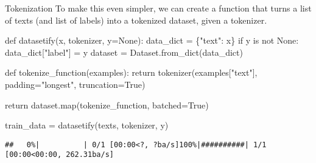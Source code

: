 \documentclass[
  10pt,
  ignorenonframetext,
  aspectratio=169]{beamer}
\newenvironment{Shaded}{\begin{snugshade}}{\end{snugshade}}
\newcommand{\BuiltInTok}[1]{\textcolor[rgb]{0.80,0.80,0.80}{#1}}
\newcommand{\ControlFlowTok}[1]{\textcolor[rgb]{0.94,0.87,0.69}{#1}}
\newcommand{\KeywordTok}[1]{\textcolor[rgb]{0.94,0.87,0.69}{#1}}
\newcommand{\NormalTok}[1]{\textcolor[rgb]{0.80,0.80,0.80}{#1}}
\newcommand{\OperatorTok}[1]{\textcolor[rgb]{0.94,0.94,0.82}{#1}}
\newcommand{\StringTok}[1]{\textcolor[rgb]{0.80,0.58,0.58}{#1}}
\newcommand{\VariableTok}[1]{\textcolor[rgb]{0.80,0.80,0.80}{#1}}
\begin{document}
\begin{frame}[fragile]{Tokenization}
\protect\hypertarget{tokenization-1}{}
To make this even simpler, we can create a function that turns a list of
texts (and list of labels) into a tokenized dataset, given a tokenizer.

\medskip
\scriptsize

\begin{Shaded}
\begin{Highlighting}[]
\KeywordTok{def}\NormalTok{ datasetify(x, tokenizer, y}\OperatorTok{=}\VariableTok{None}\NormalTok{):}
\NormalTok{    data\_dict }\OperatorTok{=}\NormalTok{ \{}\StringTok{"text"}\NormalTok{: x\}}
    \ControlFlowTok{if}\NormalTok{ y }\KeywordTok{is} \KeywordTok{not} \VariableTok{None}\NormalTok{:}
\NormalTok{        data\_dict[}\StringTok{"label"}\NormalTok{] }\OperatorTok{=}\NormalTok{ y}
\NormalTok{    dataset }\OperatorTok{=}\NormalTok{ Dataset.from\_dict(data\_dict)}

    \KeywordTok{def}\NormalTok{ tokenize\_function(examples):}
        \ControlFlowTok{return}\NormalTok{ tokenizer(examples[}\StringTok{"text"}\NormalTok{], padding}\OperatorTok{=}\StringTok{"longest"}\NormalTok{, truncation}\OperatorTok{=}\VariableTok{True}\NormalTok{)}

    \ControlFlowTok{return}\NormalTok{ dataset.}\BuiltInTok{map}\NormalTok{(tokenize\_function, batched}\OperatorTok{=}\VariableTok{True}\NormalTok{)}
  
\NormalTok{train\_data }\OperatorTok{=}\NormalTok{ datasetify(texts, tokenizer, y)}
\end{Highlighting}
\end{Shaded}

\begin{verbatim}
##   0%|          | 0/1 [00:00<?, ?ba/s]100%|##########| 1/1 [00:00<00:00, 262.31ba/s]
\end{verbatim}
\end{frame}
\end{document}
